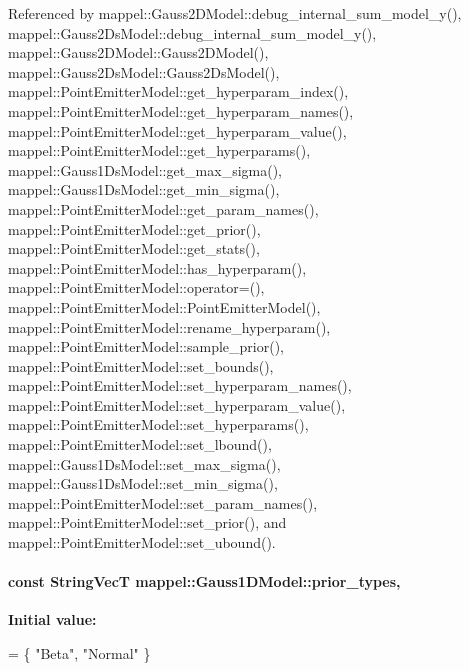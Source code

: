Referenced by mappel\+::\+Gauss2\+D\+Model\+::debug\+\_\+internal\+\_\+sum\+\_\+model\+\_\+y(), mappel\+::\+Gauss2\+Ds\+Model\+::debug\+\_\+internal\+\_\+sum\+\_\+model\+\_\+y(), mappel\+::\+Gauss2\+D\+Model\+::\+Gauss2\+D\+Model(), mappel\+::\+Gauss2\+Ds\+Model\+::\+Gauss2\+Ds\+Model(), mappel\+::\+Point\+Emitter\+Model\+::get\+\_\+hyperparam\+\_\+index(), mappel\+::\+Point\+Emitter\+Model\+::get\+\_\+hyperparam\+\_\+names(), mappel\+::\+Point\+Emitter\+Model\+::get\+\_\+hyperparam\+\_\+value(), mappel\+::\+Point\+Emitter\+Model\+::get\+\_\+hyperparams(), mappel\+::\+Gauss1\+Ds\+Model\+::get\+\_\+max\+\_\+sigma(), mappel\+::\+Gauss1\+Ds\+Model\+::get\+\_\+min\+\_\+sigma(), mappel\+::\+Point\+Emitter\+Model\+::get\+\_\+param\+\_\+names(), mappel\+::\+Point\+Emitter\+Model\+::get\+\_\+prior(), mappel\+::\+Point\+Emitter\+Model\+::get\+\_\+stats(), mappel\+::\+Point\+Emitter\+Model\+::has\+\_\+hyperparam(), mappel\+::\+Point\+Emitter\+Model\+::operator=(), mappel\+::\+Point\+Emitter\+Model\+::\+Point\+Emitter\+Model(), mappel\+::\+Point\+Emitter\+Model\+::rename\+\_\+hyperparam(), mappel\+::\+Point\+Emitter\+Model\+::sample\+\_\+prior(), mappel\+::\+Point\+Emitter\+Model\+::set\+\_\+bounds(), mappel\+::\+Point\+Emitter\+Model\+::set\+\_\+hyperparam\+\_\+names(), mappel\+::\+Point\+Emitter\+Model\+::set\+\_\+hyperparam\+\_\+value(), mappel\+::\+Point\+Emitter\+Model\+::set\+\_\+hyperparams(), mappel\+::\+Point\+Emitter\+Model\+::set\+\_\+lbound(), mappel\+::\+Gauss1\+Ds\+Model\+::set\+\_\+max\+\_\+sigma(), mappel\+::\+Gauss1\+Ds\+Model\+::set\+\_\+min\+\_\+sigma(), mappel\+::\+Point\+Emitter\+Model\+::set\+\_\+param\+\_\+names(), mappel\+::\+Point\+Emitter\+Model\+::set\+\_\+prior(), and mappel\+::\+Point\+Emitter\+Model\+::set\+\_\+ubound().

\paragraph[{\texorpdfstring{prior\+\_\+types}{prior_types}}]{\setlength{\rightskip}{0pt plus 5cm}const {\bf String\+VecT} mappel\+::\+Gauss1\+D\+Model\+::prior\+\_\+types\hspace{0.3cm}{\ttfamily [static]}, {\ttfamily [inherited]}}\hypertarget{classmappel_1_1Gauss1DModel_a2f72a3c4729aa81d8ffdd96a60374cd6}{}\label{classmappel_1_1Gauss1DModel_a2f72a3c4729aa81d8ffdd96a60374cd6}
{\bfseries Initial value\+:}
\begin{DoxyCode}
= \{ \textcolor{stringliteral}{"Beta"}, 
                                                       \textcolor{stringliteral}{"Normal"}  
                                                      \}
\end{DoxyCode}



